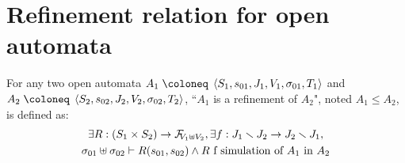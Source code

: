 \documentclass{article}
\begin{document}
\section{Refinement relation for open automata}\label{sec:refinement}
\begin{defi}
For any two open automata \(A_1 \defobject \OA{S_1}{s_{01}}{J_1}{V_1}{\sigma_{01}}{T_1}\) and \(A_2 \defobject \OA{S_2}{s_{02}}{J_2}{V_2}{\sigma_{02}}{T_2}\), ``\(A_1\) is a refinement of \(A_2\)", noted \(A_1 \leq A_2\), is defined as:
\begin{multline*}
	\exists R: \mpar{S_1 \times S_2} \to \rformulae[V_1 \uplus V_2], \exists f: J_1 \setminus J_2 \to J_2 \setminus J_1, \\
	\sigma_{01} \uplus \sigma_{02} \vdash R\mpar{s_{01}, s_{02}} \wedge R \text{ f simulation of } A_1 \text{ in } A_2
\end{multline*}
\end{defi}
\end{document}
